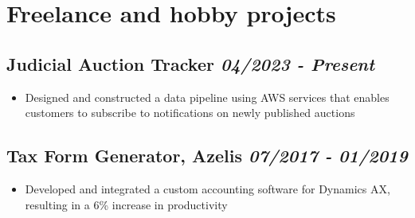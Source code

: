 \documentclass[a4paper]{article}
\newcommand{\bolditalicpair}
[2]
{\textbf{#1} \texorpdfstring{\hfill}{} \textit{#2}}
\begin{document}




\section{Freelance and hobby projects}
\subsection{\bolditalicpair{Judicial Auction Tracker}{04/2023 - Present}}

\begin{itemize}
  \item Designed and constructed a data pipeline using AWS services that enables customers to subscribe to notifications on newly published auctions
\end{itemize}

\subsection{\bolditalicpair{Tax Form Generator, Azelis}{07/2017 - 01/2019}}

\begin{itemize}
  \item Developed and integrated a custom accounting software for Dynamics AX, resulting in a 6\% increase in productivity
\end{itemize}



\end{document}
